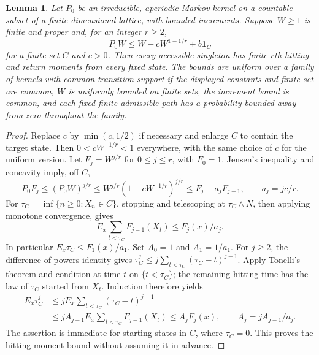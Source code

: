 \documentclass[12pt,a4paper]{article}
\newtheorem{lemma}{Lemma}
\theoremstyle{definition}
\theoremstyle{remark}\newtheorem{remark}{Remark}
\numberwithin{equation}{section}
\begin{document}
\begin{lemma}\label{lem:alloc-return}
Let $P_0$ be an irreducible, aperiodic Markov kernel on a countable subset of a finite-dimensional lattice, with bounded increments. Suppose $W\ge1$ is finite and proper and, for an integer $r\ge2$,
\[
 P_0W\le W-cW^{1-1/r}+b\mathbf1_C
\]
for a finite set $C$ and $c>0$. Then every accessible singleton has finite $r$th hitting and return moments from every fixed state. The bounds are uniform over a family of kernels with common transition support if the displayed constants and finite set are common, $W$ is uniformly bounded on finite sets, the increment bound is common, and each fixed finite admissible path has a probability bounded away from zero throughout the family.
\end{lemma}
\begin{proof}
Replace $c$ by $\min(c,1/2)$ if necessary and enlarge $C$ to contain the target state. Then $0<cW^{-1/r}<1$ everywhere, with the same choice of $c$ for the uniform version. Let $F_j=W^{j/r}$ for $0\le j\le r$, with $F_0=1$. Jensen's inequality and concavity imply, off $C$,
\[
 P_0F_j\le(P_0W)^{j/r}
 \le W^{j/r}(1-cW^{-1/r})^{j/r}
 \le F_j-a_jF_{j-1},\qquad a_j=jc/r.
\]
For $\tau_C=\inf\{n\ge0:X_n\in C\}$, stopping and telescoping at $\tau_C\wedge N$, then applying monotone convergence, gives
\[
 E_x\sum_{t<\tau_C}F_{j-1}(X_t)\le F_j(x)/a_j.
\]
In particular $E_x\tau_C\le F_1(x)/a_1$. Set $A_0=1$ and $A_1=1/a_1$. For $j\ge2$, the difference-of-powers identity gives $\tau_C^j\le j\sum_{t<\tau_C}(\tau_C-t)^{j-1}$. Apply Tonelli's theorem and condition at time $t$ on $\{t<\tau_C\}$; the remaining hitting time has the law of $\tau_C$ started from $X_t$. Induction therefore yields
\begin{align*}
 E_x\tau_C^j
 &\le jE_x\sum_{t<\tau_C}(\tau_C-t)^{j-1}\\
 &\le jA_{j-1}E_x\sum_{t<\tau_C}F_{j-1}(X_t)
 \le A_jF_j(x),\qquad A_j=jA_{j-1}/a_j.
\end{align*}
The assertion is immediate for starting states in $C$, where $\tau_C=0$. This proves the hitting-moment bound without assuming it in advance.


\end{proof}
\end{document}
